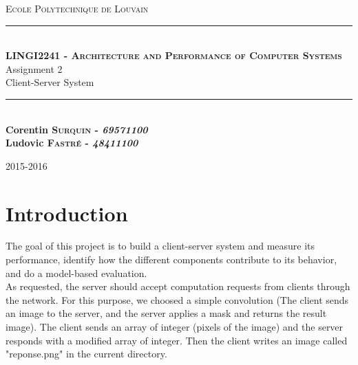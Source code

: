 \documentclass[11pt,a4paper]{article}
\newcommand{\HRule}{\rule{\linewidth}{0.5mm}}
\begin{document}
\begin{titlepage}

\begin{center}

\centering
    
    
\textsc{\Large Ecole Polytechnique de Louvain}\\[3.0cm]



\HRule \\[0.4cm]
\textsc{\LARGE \bfseries LINGI2241 - Architecture and Performance of Computer Systems}\\[0.5cm]
{ \huge Assignment 2\\ Client-Server System}\\[0.4cm]

\HRule \\[3cm]

{\LARGE \textbf{Corentin \textsc{Surquin} - \textit{69571100}} \\ \vspace{0.4cm}
\textbf{Ludovic \textsc{Fastré} - \textit{48411100}}}

\vfill



\vfill
{\large 2015-2016}

\end{center}

\end{titlepage}

\section{Introduction}

The goal of this project is to build a client-server system and measure its performance, identify how the different components contribute to its behavior, and do a model-based evaluation.\\
As requested,  the server should accept computation requests from clients through the network. For this purpose, we choosed a simple convolution (The client sends an image to the server, and the server applies a mask and returns the result image). The client sends an array of integer (pixels of the image) and the server responds with a modified array of integer. Then the client writes an image called "reponse.png" in the current directory.
\end{document}
